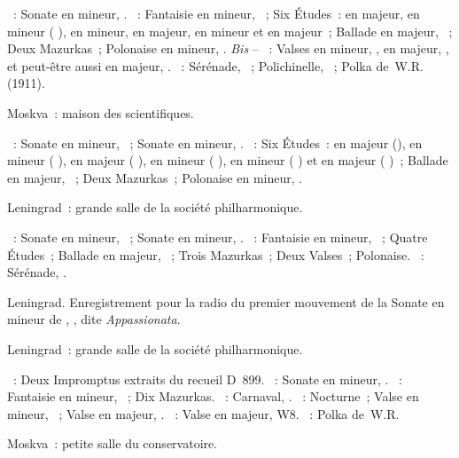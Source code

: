 \begin{description}
 \textsc{\Beethoven{}}~: Sonate en \kC mineur, .
 \textsc{\Chopin{}}~: Fantaisie en \kF mineur, ~; Six Études~: en
 \kC majeur, en \kE mineur ( ), en \kA mineur, en \kF
 majeur, en \kF mineur et en \kA \Flat majeur~; Ballade en \kA \Flat majeur,
 ~; Deux Mazurkas~; Polonaise en \kF \Sharp mineur, .
 \emph{Bis} -- \textsc{\Chopin{}}~: Valses  en \kC \Sharp mineur,
  ,  en \kA \Flat majeur,  ,
 et peut-être aussi  en \kD \Flat majeur,  .
 \textsc{\Rachmaninov{}}~: Sérénade,  ~; Polichinelle,
  ~; Polka de~W.R. (1911).
 \item[\DateWithWeekDay{1948-10-17}]
 Moskva~: maison des scientifiques.

 \textsc{\Beethoven{}}~: Sonate en \kC mineur, ~; Sonate en \kC
 mineur, .
 \textsc{\Chopin{}}~: Six Études~: en \kC majeur (), en \kA mineur
 ( ), en \kE majeur ( ), en \kE mineur
 ( ), en \kC \Sharp mineur ( ) et en
 \kA \Flat majeur ( )~; Ballade en \kA \Flat majeur,
 ~; Deux Mazurkas~; Polonaise en \kF \Sharp mineur, .
 \item[\DateWithWeekDay{1948-10-25}]
 Leningrad~: grande salle de la société philharmonique.

 \textsc{\Beethoven{}}~: Sonate en \kF mineur, ~; Sonate en \kC
 mineur, .
 \textsc{\Chopin{}}~: Fantaisie en \kF mineur, ~; Quatre Études~;
 Ballade en \kA \Flat majeur, ~; Trois Mazurkas~; Deux Valses~;
 Polonaise.
 \textsc{\Rachmaninov{}}~: Sérénade,  .
 \item[\DateWithWeekDay{1948-10-29}]
 Leningrad.
 Enregistrement pour la radio du premier mouvement de la Sonate en \kF
 mineur de \Beethoven{}, , dite \emph{Appassionata}.
 \item[\DateWithWeekDay{1948-11-03}]
 Leningrad~: grande salle de la société philharmonique.

 \textsc{\Schubert{}}~: Deux Impromptus extraits du recueil D~899.
 \textsc{\Beethoven{}}~: Sonate en \kC \Sharp mineur,  .
 \textsc{\Chopin{}}~: Fantaisie en \kF mineur, ~; Dix Mazurkas.
 \textsc{\Schumann{}}~: Carnaval, .
 \textsc{\Chopin{}}~: Nocturne~; Valse en \kC \Sharp mineur, 
 ~; Valse en \kA \Flat majeur,  .
 \textsc{\Scriabine{}}~: Valse en \kD \Flat majeur, W8.
 \textsc{\Rachmaninov{}}~: Polka de~W.R.
 \item[\DateWithWeekDay{1948-11-17}]
 Moskva~: petite salle du conservatoire.


\end{description}
